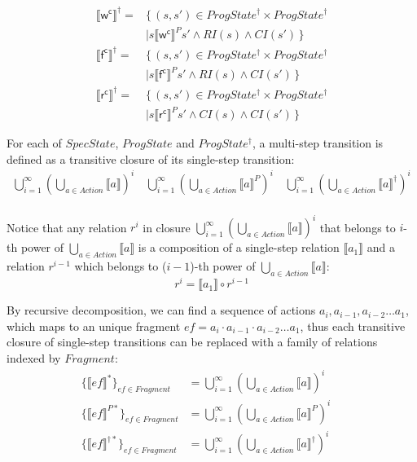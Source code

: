 \documentclass[letterpaper,twocolumn,10pt]{article}
\theoremstyle{definition}
\begin{document}
\begin{align*}
	\llbracket \mathsf {w^c} \rrbracket^\dagger ={}& \{\, (s, s') \in ProgState^\dagger \times ProgState^\dagger\\ &\mid s \llbracket \mathsf {w^c} \rrbracket^P s' \land \mathit{RI(s)} \land \mathit{CI(s')} \,\} \\
	\llbracket \mathsf {f^c} \rrbracket^\dagger ={}& \{\, (s, s') \in ProgState^\dagger \times ProgState^\dagger\\ &\mid s \llbracket \mathsf {f^c} \rrbracket^P s' \land \mathit{RI(s)} \land \mathit{CI(s')} \,\} \\
	\llbracket \mathsf {r^c} \rrbracket^\dagger ={}& \{\, (s, s') \in ProgState^\dagger \times ProgState^\dagger\\ &\mid s \llbracket \mathsf {r^c} \rrbracket^P s' \land \mathit{CI(s)} \land \mathit{CI(s')} \,\} 
\end{align*}

For each of $\mathit{SpecState}$, $\mathit{ProgState}$ and $\mathit{ProgState^\dagger}$, a multi-step transition is defined as a transitive closure of its single-step transition:
\begin{align*}
	\bigcup_{i=1}^\infty\left(\bigcup_{a \in Action} \llbracket a \rrbracket \right)^i \quad
	\bigcup_{i=1}^\infty\left(\bigcup_{a \in Action} \llbracket a \rrbracket^P \right)^i \quad
	\bigcup_{i=1}^\infty\left(\bigcup_{a \in Action} \llbracket a \rrbracket^\dagger \right)^i \\
\end{align*}

Notice that any relation $r^i$ in closure $\bigcup_{i=1}^\infty\left(\bigcup_{a \in Action} \llbracket a \rrbracket \right)^i$ that belongs to $i$-th power of $\bigcup_{a \in Action} \llbracket a \rrbracket$ is a composition of a single-step relation $\llbracket a_1 \rrbracket$ and a relation $r^{i-1}$ which belongs to (${i-1}$)-th power of $\bigcup_{a \in Action} \llbracket a \rrbracket$:
$$r^i = \llbracket a_1 \rrbracket \circ r^{i-1}$$

By recursive decomposition, we can find a sequence of actions $a_i, a_{i-1}, a_{i-2} \dots a_1$, which maps to an unique fragment $\mathit{ef} = a_i \cdot a_{i-1} \cdot a_{i-2} \dots a_1$, thus each transitive closure of single-step transitions can be replaced with a family of relations indexed by $\mathit {Fragment}$:
\begin{align*}
	\{ \llbracket \mathit{ef} \rrbracket^* \}_\mathit{ef \in Fragment} &= 
	\bigcup_{i=1}^\infty\left(\bigcup_{a \in Action} \llbracket a \rrbracket \right)^i \quad\\
	\{ \llbracket \mathit{ef} \rrbracket^{P*} \}_\mathit{ef \in Fragment} &= 
	\bigcup_{i=1}^\infty\left(\bigcup_{a \in Action} \llbracket a \rrbracket^P \right)^i \quad\\
	\{ \llbracket \mathit{ef} \rrbracket^{\dagger*} \}_\mathit{ef \in Fragment} &= 
	\bigcup_{i=1}^\infty\left(\bigcup_{a \in Action} \llbracket a \rrbracket^\dagger \right)^i
\end{align*}
\end{document}
